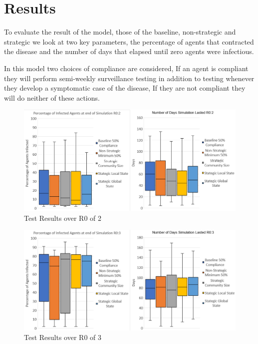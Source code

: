 \documentclass{article}
\begin{document}
\section{Results}

To evaluate the result of the model, those of the baseline, non-strategic and strategic we look at two key parameters, the percentage of agents that contracted the disease and the number of days that elapsed until zero agents were infectious.\newline

In this model two choices of compliance are considered, If an agent is compliant they will perform semi-weekly surveillance testing in addition to testing whenever they develop a symptomatic case of the disease, If they are not compliant they will do neither of these actions.\newline


\begin{figure}[h!]
\centering
\includegraphics[width=\textwidth]{5}
\caption{Test Results over R0 of 2}
\end{figure}

\newpage
\begin{figure}[h!]
\centering
\includegraphics[width=\textwidth]{4}
\caption{Test Results over R0 of 3}
\end{figure}
\end{document}
